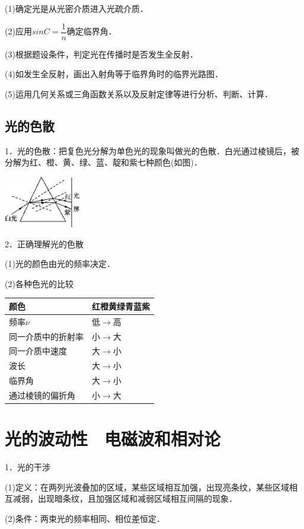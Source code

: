 (1)确定光是从光密介质进入光疏介质．

(2)应用$sinC=\dfrac{1}{n}$确定临界角．

(3)根据题设条件，判定光在传播时是否发生全反射．

(4)如发生全反射，画出入射角等于临界角时的临界光路图．

(5)运用几何关系或三角函数关系以及反射定律等进行分析、判断、计算．

\newpage
\subsection{光的色散}

1．光的色散：把复色光分解为单色光的现象叫做光的色散．白光通过棱镜后，被分解为红、橙、黄、绿、蓝、靛和紫七种颜色(如图)．

\begin{center}\includegraphics[width=1.31111in,height=0.88681in]{media/image550.png}\end{center}

2．正确理解光的色散

(1)光的颜色由光的频率决定．

(2)各种色光的比较

\begin{longtable}[]{@{}ll@{}}
\toprule
颜色 & 红橙黄绿青蓝紫\tabularnewline
\midrule
\endhead
频率$\nu$ & 低$\rightarrow$高\tabularnewline
同一介质中的折射率 & 小$\rightarrow$大\tabularnewline
同一介质中速度 & 大$\rightarrow$小\tabularnewline
波长 & 大$\rightarrow$小\tabularnewline
临界角 & 大$\rightarrow$小\tabularnewline
通过棱镜的偏折角 & 小$\rightarrow$大\tabularnewline
\bottomrule
\end{longtable}

\newpage
\section{光的波动性　电磁波和相对论}



1．光的干涉

(1)定义：在两列光波叠加的区域，某些区域相互加强，出现亮条纹，某些区域相互减弱，出现暗条纹，且加强区域和减弱区域相互间隔的现象．

(2)条件：两束光的频率相同、相位差恒定．

